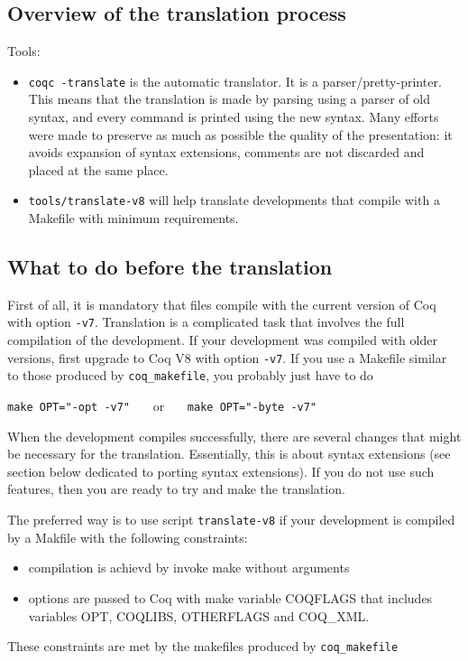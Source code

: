 \documentclass[11pt,a4paper]{article}
\begin{document}
\subsection{Overview of the translation process}

Tools:
\begin{itemize}
\item {\tt coqc -translate}
is the automatic translator. It is a parser/pretty-printer. This means
that the translation is made by parsing using a parser of old syntax,
and every command is printed using the new syntax. Many efforts were
made to preserve as much as possible the quality of the presentation:
it avoids expansion of syntax extensions, comments are not discarded
and placed at the same place.
\item {\tt tools/translate-v8} will help translate developments that
compile with a Makefile with minimum requirements.
\end{itemize}

\subsection{What to do before the translation}

First of all, it is mandatory that files compile with the current
version of Coq with option {\tt -v7}. Translation is a complicated
task that involves the full compilation of the development. If your
development was compiled with older versions, first upgrade to Coq V8
with option {\tt -v7}. If you use a Makefile similar to those produced
by {\tt coq\_makefile}, you probably just have to do

{\tt make OPT="-opt -v7"} ~~~or~~~ {\tt make OPT="-byte -v7"}

When the development compiles successfully, there are several changes
that might be necessary for the translation. Essentially, this is
about syntax extensions (see section below dedicated to porting syntax
extensions). If you do not use such features, then you are ready to
try and make the translation.

The preferred way is to use script {\tt translate-v8} if your development
is compiled by a Makfile with the following constraints:
\begin{itemize}
\item compilation is achievd by invoke make without arguments
\item options are passed to Coq with make variable COQFLAGS that
  includes variables OPT, COQLIBS, OTHERFLAGS and COQ_XML.
\end{itemize}
These constraints are met by the makefiles produced by {\tt coq\_makefile}
\end{document}

